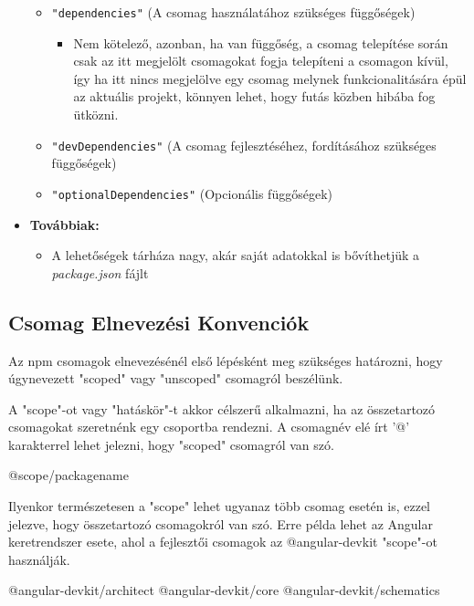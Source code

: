 \begin{itemize}
\begin{itemize}
			\item \texttt{"dependencies"} (A csomag használatához szükséges függőségek)
			\begin{itemize}
				\item Nem kötelező, azonban, ha van függőség, a csomag telepítése során csak az itt megjelölt csomagokat fogja telepíteni a csomagon kívül, így ha itt nincs megjelölve egy csomag melynek funkcionalitására épül az aktuális projekt, könnyen lehet, hogy futás közben hibába fog ütközni.
			\end{itemize}
			\item \texttt{"devDependencies"} (A csomag fejlesztéséhez, fordításához szükséges függőségek)
			\item \texttt{"optionalDependencies"} (Opcionális függőségek)
		\end{itemize}
		\item \textbf{Továbbiak:}
		\begin{itemize}
			\item A lehetőségek tárháza nagy, akár saját adatokkal is bővíthetjük a \emph{package.json} fájlt 
		\end{itemize}
	\end{itemize}

	\begin{flushright}
		\cite{npm-package.json}
	\end{flushright}
	
	\subsection{Csomag Elnevezési Konvenciók}
	
	Az npm csomagok elnevezésénél első lépésként meg szükséges határozni, hogy úgynevezett "scoped" vagy "unscoped" csomagról beszélünk.
	
	A "scope"-ot vagy "hatáskör"-t akkor célszerű alkalmazni, ha az összetartozó csomagokat szeretnénk egy csoportba rendezni. A csomagnév elé írt '@' karakterrel lehet jelezni, hogy "scoped" csomagról van szó.
	
	\begin{js}
@scope/packagename
	\end{js}

	Ilyenkor természetesen a "scope" lehet ugyanaz több csomag esetén is, ezzel jelezve, hogy összetartozó csomagokról van szó.
	Erre példa lehet az Angular keretrendszer esete, ahol a fejlesztői csomagok az @angular-devkit "scope"-ot használják.
	
	\begin{js}
@angular-devkit/architect
@angular-devkit/core
@angular-devkit/schematics
	\end{js}

